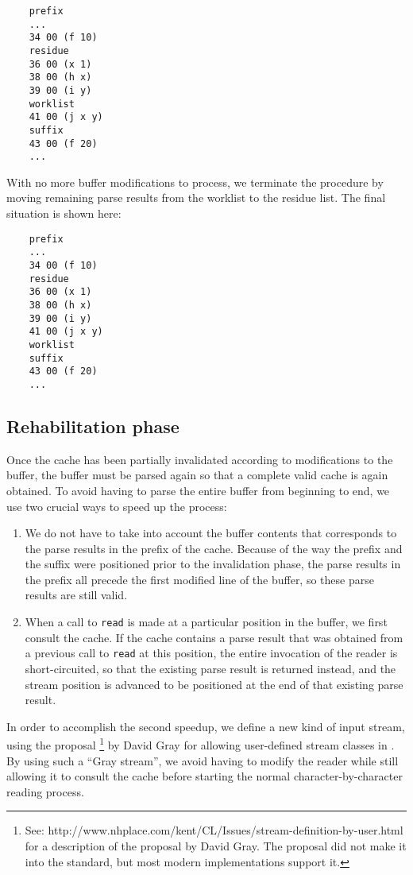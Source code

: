 {\small\begin{verbatim}
    prefix
    ...
    34 00 (f 10)
    residue
    36 00 (x 1)
    38 00 (h x)
    39 00 (i y)
    worklist
    41 00 (j x y)
    suffix
    43 00 (f 20)
    ...
\end{verbatim}}

With no more buffer modifications to process, we terminate the
procedure by moving remaining parse results from the worklist to the
residue list.  The final situation is shown here:

{\small\begin{verbatim}
    prefix
    ...
    34 00 (f 10)
    residue
    36 00 (x 1)
    38 00 (h x)
    39 00 (i y)
    41 00 (j x y)
    worklist
    suffix
    43 00 (f 20)
    ...
\end{verbatim}}

\subsection{Rehabilitation phase}

Once the cache has been partially invalidated according to
modifications to the buffer, the buffer must be parsed again so that a
complete valid cache is again obtained.  To avoid having to parse the
entire buffer from beginning to end, we use two crucial ways to speed
up the process:

\begin{enumerate}
\item We do not have to take into account the buffer contents that
  corresponds to the parse results in the prefix of the cache.
  Because of the way the prefix and the suffix were positioned prior
  to the invalidation phase, the parse results in the prefix all
  precede the first modified line of the buffer, so these parse
  results are still valid.
\item When a call to \texttt{read} is made at a particular position in
  the buffer, we first consult the cache.  If the cache contains a
  parse result that was obtained from a previous call to \texttt{read}
  at this position, the entire invocation of the reader is
  short-circuited, so that the existing parse result is returned
  instead, and the stream position is advanced to be positioned at the
  end of that existing parse result.
\end{enumerate}

In order to accomplish the second speedup, we define a new kind of
input stream, using the proposal%
\footnote{See:
  http://www.nhplace.com/kent/CL/Issues/stream-definition-by-user.html
  for a description of the proposal by David Gray.  The proposal did
  not make it into the \commonlisp{} standard, but most modern
  implementations support it.}
 by David Gray for allowing user-defined stream classes in
 \commonlisp{}.  By using such a ``Gray stream'', we avoid having to
 modify the reader while still allowing it to consult the cache before
 starting the normal character-by-character reading process.

